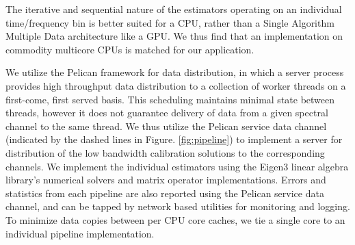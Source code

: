 \documentclass{aa}
\begin{document}
The iterative and sequential nature of the estimators operating on an individual
time/frequency bin  is better suited for  a CPU, rather than  a Single Algorithm
Multiple Data architecture  like a GPU.  We thus find  that an implementation on
commodity multicore CPUs is matched for our application.

We   utilize   the  Pelican   \citep{salvini2011pelican}   framework  for   data
distribution,  in   which  a  server  process  provides   high  throughput  data
distribution to  a collection  of worker threads  on a first-come,  first served
basis. This scheduling maintains minimal  state between threads, however it does
not guarantee delivery of data from a given spectral channel to the same thread.
We thus utilize the Pelican service  data channel (indicated by the dashed lines
in Figure.   \ref{fig:pipeline}) to implement  a server for distribution  of the
low bandwidth calibration solutions  to the corresponding channels. We implement
the  individual  estimators using  the  Eigen3  \citep{eigenweb} linear  algebra
library's  numerical solvers  and matrix  operator implementations.   Errors and
statistics from each  pipeline are also reported using  the Pelican service data
channel,  and  can be  tapped  by network  based  utilities  for monitoring  and
logging. To  minimize data copies between per  CPU core caches, we  tie a single
core to an individual pipeline implementation.


\end{document}
